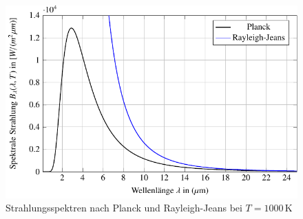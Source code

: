 %
%
%
\begin{figure}
\centering
\includegraphics{papers/fourier/images/strahlung.pdf}
\caption{Strahlungsspektren nach Planck und Rayleigh-Jeans bei $T=1000\,\mathrm{K}$
\label{fourier:fig:strahlungsspektren}}
\end{figure}